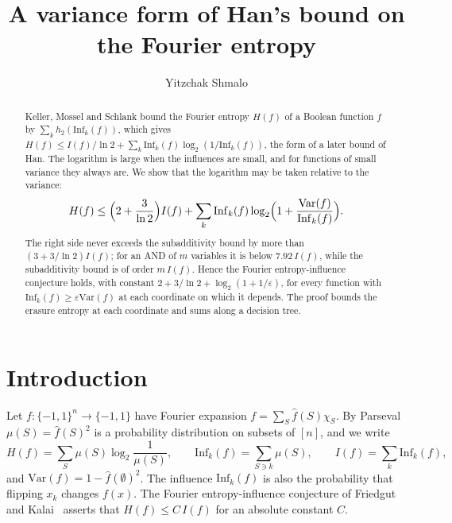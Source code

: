 \documentclass[11pt]{amsart}
\title{A variance form of Han's bound on the Fourier entropy}
\author{Yitzchak Shmalo}
\date{}
\theoremstyle{remark}
\newcommand{\Inf}{\mathrm{Inf}}
\newcommand{\Var}{\mathrm{Var}}
\begin{document}
\begin{abstract}
Keller, Mossel and Schlank bound the Fourier entropy $H(f)$ of a Boolean function $f$ by $\sum_k h_2(\Inf_k(f))$, which
gives $H(f)\le I(f)/\ln2+\sum_k\Inf_k(f)\log_2(1/\Inf_k(f))$, the form of a later bound of Han. The logarithm is large
when the influences are small, and for functions of small variance they always are. We show that the logarithm may
be taken relative to the variance:
\[
H(f)\le \Bigl(2+\frac{3}{\ln 2}\Bigr)I(f)+\sum_k \Inf_k(f)\log_2\Bigl(1+\frac{\Var(f)}{\Inf_k(f)}\Bigr).
\]
The right side never exceeds the subadditivity bound by more than $(3+3/\ln2)I(f)$; for an AND of $m$ variables it is
below $7.92\,I(f)$, while the subadditivity bound is of order $m\,I(f)$. Hence the Fourier entropy-influence conjecture
holds, with constant $2+3/\ln2+\log_2(1+1/\varepsilon)$, for every function with $\Inf_k(f)\ge\varepsilon\Var(f)$ at
each coordinate on which it depends. The proof bounds the erasure entropy at each coordinate and sums along a decision
tree.
\end{abstract}


\maketitle

\section{Introduction}\label{sec:intro}

Let $f:\{-1,1\}^n\to\{-1,1\}$ have Fourier expansion $f=\sum_S\hat f(S)\chi_S$. By Parseval $\mu(S)=\hat f(S)^2$ is a
probability distribution on subsets of $[n]$, and we write
\[
H(f)=\sum_S\mu(S)\log_2\frac1{\mu(S)},\qquad \Inf_k(f)=\sum_{S\ni k}\mu(S),\qquad I(f)=\sum_k\Inf_k(f),
\]
and $\Var(f)=1-\hat f(\emptyset)^2$. The influence $\Inf_k(f)$ is also the probability that flipping $x_k$ changes
$f(x)$. The Fourier entropy-influence conjecture of Friedgut and Kalai~\cite{FK96} asserts that $H(f)\le C\,I(f)$ for
an absolute constant $C$.
\end{document}

